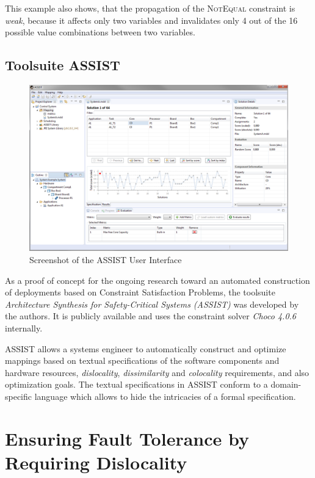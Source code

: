 \documentclass[conference]{IEEEtran}
\begin{document}
This example also shows, that the propagation of the \textsc{NotEqual} constraint is \emph{weak}, because it affects only two variables and invalidates only 4 out of the 16 possible value combinations between two variables.

\subsection{Toolsuite ASSIST}

\begin{figure}[ht!]
\centering
\includegraphics[width=.9\textwidth]{assist-screenshot}
\caption{Screenshot of the ASSIST User Interface}
\label{tool}
\end{figure}

As a proof of concept for the ongoing research toward an automated construction of deployments based on Constraint Satisfaction Problems, the toolsuite \emph{Architecture Synthesis for Safety-Critical Systems (ASSIST)} was developed by the authors.
It is publicly available and uses the constraint solver \emph{Choco 4.0.6}~\cite{Prudhomme2016} internally.

ASSIST allows a systems engineer to automatically construct and optimize mappings based on textual specifications of the software components and hardware resources, \textit{dislocality}, \textit{dissimilarity} and \textit{colocality} requirements, and also optimization goals.
The textual specifications in ASSIST conform to a domain-specific language which allows to hide the intricacies of a formal specification.

\section{Ensuring Fault Tolerance by Requiring Dislocality}
\end{document}
